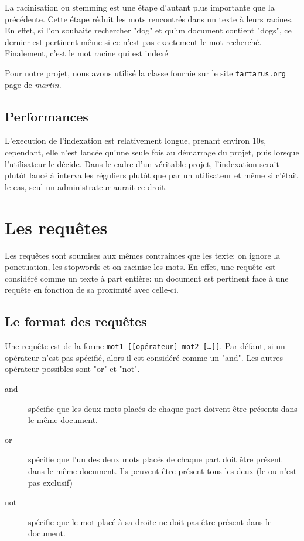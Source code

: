\documentclass[a4paper,10pt]{report}
\begin{document}
La racinisation ou stemming est une \'etape d'autant plus importante que la pr\'ec\'edente. Cette \'etape r\'eduit les mots rencontr\'es dans un texte \`a leurs racines. En effet, si l'on souhaite rechercher "dog" et qu'un document contient "dogs", ce dernier est pertinent m\^eme si ce n'est pas exactement le mot recherch\'e. Finalement, c'est le mot racine qui est index\'e 

Pour notre projet, nous avons utilis\'e la classe fournie sur le site \texttt{tartarus.org} page de \textit{martin}.

\subsection{Performances}

L'execution de l'indexation est relativement longue, prenant environ 10s, cependant, elle n'est lancée qu'une seule fois au démarrage du projet, puis lorsque l'utilisateur le décide. Dans le cadre d'un véritable projet, l'indexation serait plutôt lancé à intervalles réguliers plutôt que par un utilisateur et même si c'était le cas, seul un administrateur aurait ce droit.

\section{Les requ\^etes}

Les requ\^etes sont soumises aux m\^emes contraintes que les texte: on ignore la ponctuation, les stopwords et on racinise les mots. En effet, une requ\^ete est consid\'er\'e comme un texte \`a part enti\`ere: un document est pertinent face \`a une requ\^ete en fonction de sa proximit\'e avec celle-ci.

\subsection{Le format des requ\^etes}

Une requ\^ete est de la forme \texttt{mot1 \verb?[?\verb?[?op\'erateur\verb?]? mot2 \verb?[?\ldots\verb?]]?}. Par d\'efaut, si un op\'erateur n'est pas sp\'ecifi\'e, alors il est consid\'er\'e comme un "and". Les autres op\'erateur possibles sont "or" et "not". 

\begin{description}
 \item[and] sp\'ecifie que les deux mots plac\'es de chaque part doivent \^etre pr\'esents dans le m\^eme document.
 \item[or] sp\'ecifie que l'un des deux mots plac\'es de chaque part doit \^etre pr\'esent dans le m\^eme document. Ils peuvent \^etre pr\'esent tous les deux (le ou n'est pas exclusif)
 \item[not] sp\'ecifie que le mot plac\'e \`a sa droite ne doit pas \^etre pr\'esent dans le document.
\end{description}
\end{document}
